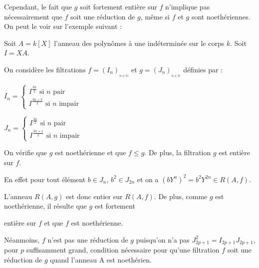 \begin{maremarque}
	Cependant, le fait que $g$ soit fortement entière sur $f$ n'implique pas
	nécessairement que $f$ soit une réduction de $g$, même si $f$ et 
	$g$ sont noethériennes. On peut le voir sur l'exemple suivant : 
	
	Soit $A=k[X]$ l'anneau des polynômes à une indéterminée sur le
	corps $k$. Soit $I=XA$. 
	
	On considère les filtrations $f=(I_{n})_{_{n\in \mathbb{N}}}$ et $g=(J_{n})_{_{n\in \mathbb{N}}}$ définies par
	:
	
	$I_{n}=\left\{ 
	\begin{array}{c}
		I^{\frac{3n}{2}}\text{ si }n\text{ pair} \\ 
		I^{\frac{3n+3}{2}}\text{ si }n\text{ impair}
	\end{array}
	\right. $
	
	$J_{n}=\left\{ 
	\begin{array}{c}
		I^{\frac{3n}{2}}\text{ si }n\text{ pair} \\ 
		I^{\frac{3n+1}{2}}\text{ si }n\text{ impair}
	\end{array}
	\right. $
	
	On vérifie que $g$ est noethérienne et que $f\leq g$. De plus, la
	filtration $g$ est entière sur $f$. 
	
	En effet pour tout élément $b\in J_{n}$, $b^{2}\in J_{2n}$ et on a $(bY^{n})^{2}=b^{2}Y^{2n}\in R(A,f)$. 
	
	L'anneau $R(A,g)$ est donc entier sur $R(A,f)$. De plus, comme $g$ est noethérienne, il résulte que $g$ est fortement
	
	entière sur $f$ et que $f$ est noethérienne. 
	
	Néanmoins, $f$ n'est pas une réduction de $g$ puisqu'on n'a pas $J_{2p+1}^{2}=I_{2p+1}J_{2p+1}$, pour $p$ suffisamment grand, condition nécessaire pour qu'une filtration $f$ soit une réduction de $g$ quand
	l'anneau A est noethérien. 
\end{maremarque}
